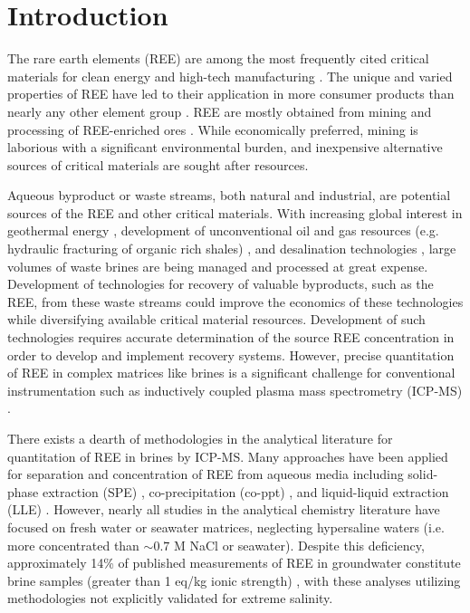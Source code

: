 \section{Introduction}

The rare earth elements (REE) are among the most frequently cited critical materials for clean energy and high-tech manufacturing \citep{APS_CritMat,USDOE_CritMat}.
The unique and varied properties of REE have led to their application in more consumer products than nearly any other element group \citep{Castor_Hedrick}.
REE are mostly obtained from mining and processing of REE-enriched ores \citep{USDOE_CritMat}.
While economically preferred, mining is laborious with a significant environmental burden, and inexpensive alternative sources of critical materials are sought after resources.

Aqueous byproduct or waste streams, both natural and industrial, are potential sources of the REE and other critical materials.
With increasing global interest in geothermal energy \citep{Lund_Geothermics_2011},
development of unconventional oil and gas resources (e.g. hydraulic fracturing of organic rich shales) \citep{EIA_2013},
and desalination technologies \citep{Shannon_Nat_2008, Elimelech_Sci_2011},
large volumes of waste brines are being managed and processed at great expense.
Development of technologies for recovery of valuable byproducts, such as the REE, from these waste streams could improve the economics of these technologies while diversifying available critical material resources.
Development of such technologies requires accurate determination of the source REE concentration in order to develop and implement recovery systems.
However, precise quantitation of REE in complex matrices like brines is a significant challenge for conventional instrumentation such as inductively coupled plasma mass spectrometry (ICP-MS) \citep{Agatemor_ACA_2011}.

There exists a dearth of methodologies in the analytical literature for quantitation of REE in brines by ICP-MS.
Many approaches have been applied for separation and concentration of REE from aqueous media including solid-phase extraction (SPE)
\citep{Benkhedda_JAAS_2001, Fu_Tal_2007, Haley_MC_2003, Halicz_JAAS_1996, Hirata_Tal_2002, Kajiya_SAB_2004, Katarina_Tal_2009, Kim_AG_2010, Kuhn_FJAC_2000, Kumar_Desal_2011, Moller_SAB_1992, Stetzenbach_GW_1994, Vicente_SAB_1998, Wen_Analyst_1999, Willie_SAB_2001, Zhang_AC_1998, Zhu_Tal_2009},
co-precipitation (co-ppt) \citep{Shaw_AC_2003, Shannon_REEinGWFS, Raso_Tal_2013},
and liquid-liquid extraction (LLE) \citep{Shabani_AC_1990, Lawrence_GGR_2007, Kimura_BCSJ_1960, Kimura_BCSJ_1961}.
However, nearly all studies in the analytical chemistry literature have focused on fresh water or seawater matrices, neglecting hypersaline waters (i.e. more concentrated than $\sim0.7$ M NaCl or seawater).
Despite this deficiency, approximately 14\% of published measurements of REE in groundwater constitute brine samples (greater than 1 eq/kg ionic strength) \citep{Noack_EST_2014}, with these analyses utilizing methodologies not explicitly validated for extreme salinity.

